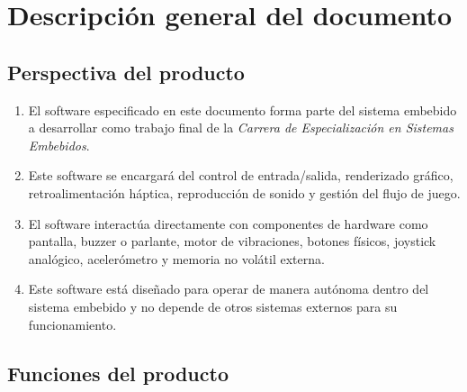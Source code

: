 \documentclass[11pt,a4paper]{article}
\begin{document}
\section{Descripción general del documento}


\subsection{Perspectiva del producto}

\begin{enumerate}
  \item El software especificado en este documento forma parte del sistema embebido \textit{\ttitle} a desarrollar como trabajo final de la \textit{Carrera de Especialización en Sistemas Embebidos}. 
  \item Este software se encargará del control de entrada/salida, renderizado gráfico, retroalimentación háptica, reproducción de sonido y gestión del flujo de juego.
  \item El software interactúa directamente con componentes de hardware como pantalla, buzzer o parlante, motor de vibraciones, botones físicos, joystick analógico, acelerómetro y memoria no volátil externa.
  \item Este software está diseñado para operar de manera autónoma dentro del sistema embebido y no depende de otros sistemas externos para su funcionamiento. 
\end{enumerate}


\subsection{Funciones del producto}
\end{document}
